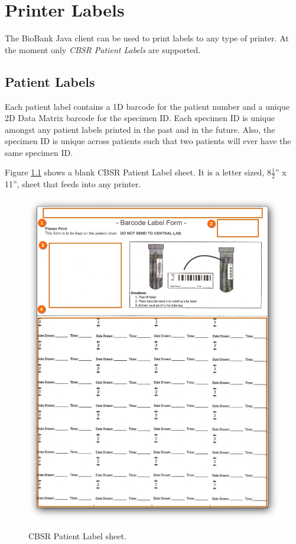 \chapter{Printer Labels}
\label{chap:printer_labels}

The BioBank Java client can be used to print labels to any type of printer. At
the moment only \emph{CBSR Patient Labels} are supported.

\section{Patient Labels}
\label{sec:printer_labels}

 Each patient label contains a 1D barcode for the patient number and a unique
 2D Data Matrix barcode for the specimen ID. Each specimen ID is unique amongst
 any patient labels printed in the past and in the future. Also, the specimen
 ID is unique across patients such that two patients will ever have the
 same specimen ID.

Figure \ref{fig:cbsr_patient_label_sheet} shows a blank CBSR Patient Label
sheet. It is a letter sized, 8$\frac{1}{2}$'' x 11'', sheet that
feeds into any printer.

\begin{figure}[H]
  \centering
  \scalebox{0.35}
	   { \includegraphics*{screenshots/printer_labels/01_cbsr_patient_label_sheet} }
	   \caption{CBSR Patient Label sheet.}
	   \label{fig:cbsr_patient_label_sheet}
\end{figure}

